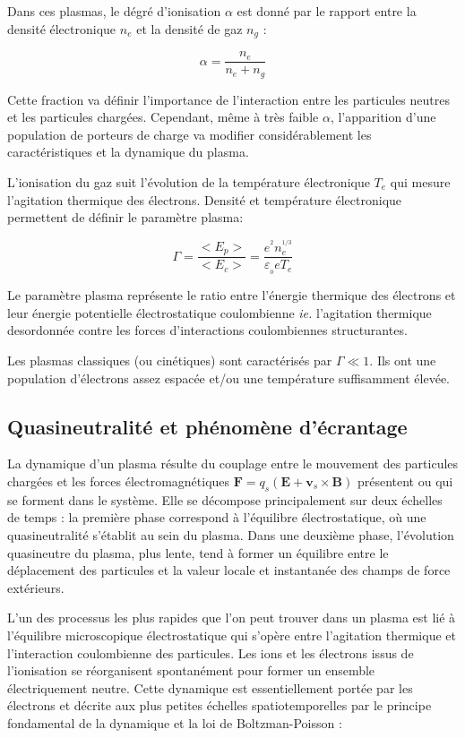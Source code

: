 Dans ces plasmas, le dégré d'ionisation $\alpha$ est donné par le rapport
entre la densité électronique $n_e$ et la densité de gaz $n_g$ :

\begin{equation}
\alpha=\frac{n_e}{n_e+n_g}
\end{equation}

Cette fraction va définir l'importance de l'interaction entre les particules
neutres et les particules chargées. Cependant, même à très faible $\alpha$,
l'apparition d'une population de porteurs de charge va modifier considérablement 
les caractéristiques et la dynamique du plasma.

L'ionisation du gaz suit l'évolution de la température électronique $T_e$ qui
mesure l'agitation thermique des électrons. Densité et température
électronique permettent de définir le paramètre plasma:

\begin{equation}
\label{1-paramPlasma}
\Gamma=\frac{<E_p>}{<E_c>}=\frac{e^{^2}n_e^{^{1/3}}}{\varepsilon_{_0}
eT_e}
\end{equation}

Le paramètre plasma représente le ratio entre l'énergie thermique des
électrons et leur énergie potentielle électrostatique coulombienne \emph{ie.}
l'agitation thermique desordonnée contre les forces d'interactions
coulombiennes structurantes.

Les plasmas classiques (ou cinétiques) sont caractérisés par
$\Gamma\ll 1$. Ils ont une population d'électrons assez espacée et/ou une
température suffisamment élevée.

\subsection{Quasineutralité et phénomène d'écrantage}
La dynamique d'un plasma résulte du couplage entre le mouvement des
particules chargées et les forces électromagnétiques $\mathbf
F=q_s(\mathbf E+ \mathbf v_s\times\mathbf B)$
présentent ou qui se forment dans le système. Elle se décompose principalement sur deux échelles de temps : la première
phase correspond à l'équilibre électrostatique, où une
quasineutralité s'établit au sein du plasma. Dans une deuxième phase, l'évolution quasineutre du
plasma, plus lente, tend à former un équilibre entre le déplacement des particules et la valeur locale
et instantanée des champs de force extérieurs.

L'un des processus les plus rapides que l'on peut trouver dans un plasma est lié à
l'équilibre microscopique électrostatique qui s'opère
entre l'agitation thermique et l'interaction coulombienne des particules. Les
ions et les électrons issus de l'ionisation se réorganisent spontanément pour former un ensemble électriquement neutre.
Cette dynamique est essentiellement portée par les électrons et décrite aux plus petites
échelles spatiotemporelles par le principe fondamental de la dynamique et la loi de Boltzman-Poisson :

